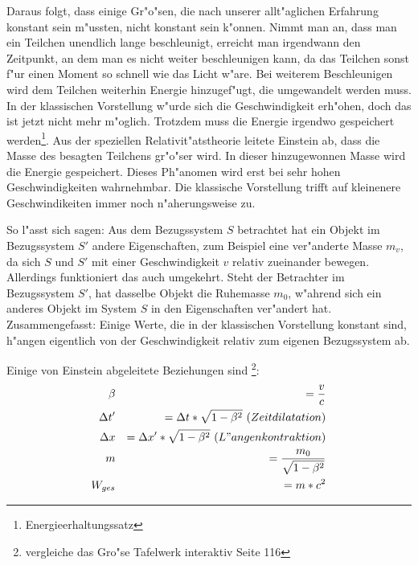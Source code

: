 \documentclass[14pt, a4paper]{report}
\begin{document}
Daraus folgt, dass einige Gr"o"sen, die nach unserer allt"aglichen Erfahrung konstant
sein m"ussten, nicht konstant sein k"onnen. Nimmt man an, dass man ein Teilchen 
unendlich lange beschleunigt, erreicht man irgendwann den Zeitpunkt, an dem man es nicht weiter
beschleunigen kann, da das Teilchen sonst f"ur einen Moment so schnell wie das Licht 
w"are. Bei weiterem Beschleunigen wird dem Teilchen weiterhin Energie hinzugef"ugt, die 
umgewandelt werden muss. In der klassischen Vorstellung 
w"urde sich die Geschwindigkeit erh"ohen, doch das ist jetzt nicht mehr m"oglich. 
Trotzdem muss die Energie irgendwo gespeichert werden\footnote{Energieerhaltungssatz}. 
Aus der speziellen Relativit"atstheorie leitete Einstein ab, dass die Masse des besagten
Teilchens gr"o"ser wird. In dieser hinzugewonnen Masse wird die Energie gespeichert.
Dieses Ph"anomen wird erst bei sehr hohen Geschwindigkeiten wahrnehmbar. Die klassische 
Vorstellung trifft auf kleinenere Geschwindikeiten immer noch n"aherungsweise zu.

So l"asst sich sagen: Aus dem Bezugssystem $S$ betrachtet hat 
ein Objekt im Bezugssystem $S'$ andere Eigenschaften, zum Beispiel eine ver"anderte 
Masse $m_v$, da sich $S$ und $S'$ mit einer Geschwindigkeit $v$ relativ zueinander bewegen. 
Allerdings funktioniert das auch umgekehrt. Steht der Betrachter im Bezugssystem $S'$,
hat dasselbe Objekt die Ruhemasse $m_0$, w"ahrend sich ein anderes Objekt im System $S$ 
in den Eigenschaften ver"andert hat. Zusammengefasst: Einige Werte, die in der 
klassischen Vorstellung konstant sind, h"angen eigentlich von der Geschwindigkeit 
relativ zum eigenen Bezugssystem ab.

Einige von Einstein abgeleitete Beziehungen sind 
\footnote{vergleiche das Gro"se Tafelwerk interaktiv Seite 116 }:
\begin{eqnarray}
\beta && = \frac{v}{c} \\
\Delta t' && = \Delta t * \sqrt{1 - \beta^2} ~ (Zeitdilatation) \\
\Delta x && = \Delta x' * \sqrt{1 - \beta^2} ~ (L"angenkontraktion) \\
m && = \frac{m_0}{\sqrt{1 - \beta^2}} \label{var_m} \\
W_{ges} && = m * c^2 \label{mc_square}
\end{eqnarray}
\end{document}
